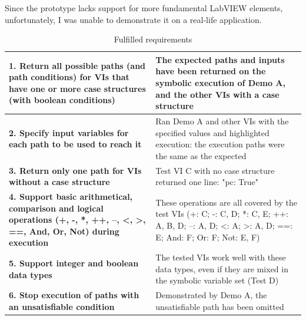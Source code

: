 Since the prototype lacks support for more fundamental LabVIEW elements, unfortunately, I was unable to demonstrate it on a real-life application.

\begin{table}[ht]
\centering
\begin{tabularx}{\linewidth}{XX}
\toprule
\textbf{1. Return all possible paths (and path conditions) for VIs that have one or more case structures (with boolean conditions)}                         & The expected paths and inputs have been returned on the symbolic execution of Demo A, and the other VIs with a case structure                                           \\ \midrule
\textbf{2. Specify input variables for each path to be used to reach it}                                                                                    & Ran Demo A and other VIs with the specified values and highlighted execution: the execution paths were the same as the expected                                         \\ \midrule
\textbf{3. Return only one path for VIs without a case structure}                                                                                           & Test VI C with no case structure returned one line: "pc: True"                                                                                           \\ \midrule
\textbf{4. Support basic arithmetical, comparison and logical operations (+, -, *, ++, --, \textless{}, \textgreater{}, ==, And, Or, Not) during execution} & These operations are all covered by the test VIs (+: C; -: C, D; *: C, E; ++: A, B, D; --: A, D; \textless{}: A; \textgreater{}: A, D; ==: E; And: F; Or: F; Not: E, F) \\ \midrule
\textbf{5. Support integer and boolean data types}                                                                                                          & The tested VIs work well with these data types, even if they are mixed in the symbolic variable set (Test D)                                                            \\ \midrule
\textbf{6. Stop execution of paths with an unsatisfiable condition}                                                                                         & Demonstrated by Demo A, the unsatisfiable path has been omitted                                                                                                         \\ \bottomrule
\end{tabularx}

\caption{Fulfilled requirements}
  \label{Tab:Requ}
\end{table}


